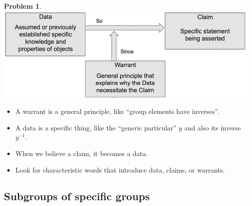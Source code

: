 \documentclass[12pt]{article}
\theoremstyle{definition} %
\newtheorem{problem}{Problem}
\newcommand\inv{^{-1}} %
\begin{document}
\begin{problem}
    \begin{minipage}{0.5\textwidth}
        \href{https://github.com/rhinopotamus/math312/blob/2f0aa44212c2d23d921378ffb9bc1fb20295a619/latex/images/toulmin.png}{\includegraphics[width=\textwidth]{../images/toulmin.png}}
    \end{minipage}
    \begin{minipage}{0.5\textwidth}
        \begin{itemize}
            \setlength\itemsep{0.2em}
            \item A warrant is a general principle, like ``group elements have inverses''.
            \item A data is a specific thing, like the ``generic particular'' $y$ and also its inverse $y\inv$.
            \item When we believe a claim, it becomes a data.
            \item Look for characteristic words that introduce data, claims, or warrants. 
        \end{itemize}
    \end{minipage}
\end{problem}


\subsection*{Subgroups of specific groups}
\end{document}
